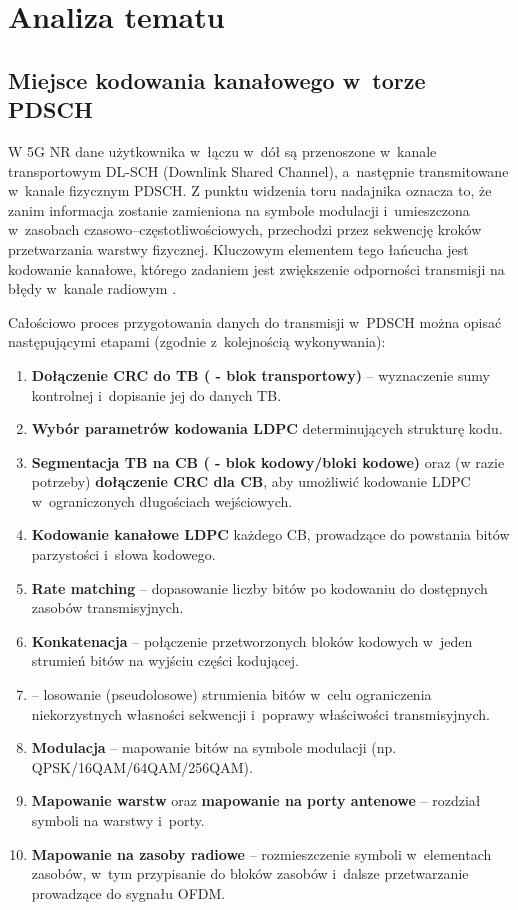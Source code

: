 \chapter{Analiza tematu}
\label{ch:analiza}

\section{Miejsce kodowania kanałowego w~torze PDSCH}
\label{sec:analiza_kontekst}

W 5G NR dane użytkownika w~łączu w~dół są przenoszone w~kanale transportowym DL-SCH (Downlink Shared Channel), a~następnie transmitowane w~kanale fizycznym PDSCH. Z punktu widzenia toru nadajnika oznacza to, że zanim informacja zostanie zamieniona na symbole modulacji i~umieszczona w~zasobach czasowo--częstotliwościowych, przechodzi przez sekwencję kroków przetwarzania warstwy fizycznej. Kluczowym elementem tego łańcucha jest kodowanie kanałowe, którego zadaniem jest zwiększenie odporności transmisji na błędy w~kanale radiowym \cite{bib:3gpp_38212}.

Całościowo proces przygotowania danych do transmisji w~PDSCH można opisać następującymi etapami (zgodnie z~kolejnością wykonywania):
\begin{enumerate}
  \item \textbf{Dołączenie CRC do TB ( - blok transportowy)} -- wyznaczenie sumy kontrolnej i~dopisanie jej do danych TB.
  \item \textbf{Wybór parametrów kodowania LDPC} determinujących strukturę kodu.
  \item \textbf{Segmentacja TB na CB ( - blok kodowy/bloki kodowe)} oraz (w razie potrzeby) \textbf{dołączenie CRC dla CB}, aby umożliwić kodowanie LDPC w~ograniczonych długościach wejściowych.
  \item \textbf{Kodowanie kanałowe LDPC} każdego CB, prowadzące do powstania bitów parzystości i~słowa kodowego.
  \item \textbf{Rate matching} -- dopasowanie liczby bitów po kodowaniu do dostępnych zasobów transmisyjnych.
  \item \textbf{Konkatenacja} -- połączenie przetworzonych bloków kodowych w~jeden strumień bitów na wyjściu części kodującej.
  \item \textbf{} -- losowanie (pseudolosowe) strumienia bitów w~celu ograniczenia niekorzystnych własności sekwencji i~poprawy właściwości transmisyjnych.
  \item \textbf{Modulacja} -- mapowanie bitów na symbole modulacji (np. QPSK/16QAM/64QAM/256QAM).
  \item \textbf{Mapowanie warstw} oraz \textbf{mapowanie na porty antenowe} -- rozdział symboli na warstwy i~porty.
  \item \textbf{Mapowanie na zasoby radiowe} -- rozmieszczenie symboli w~elementach zasobów, w~tym przypisanie do bloków zasobów i~dalsze przetwarzanie prowadzące do sygnału OFDM.
\end{enumerate}

